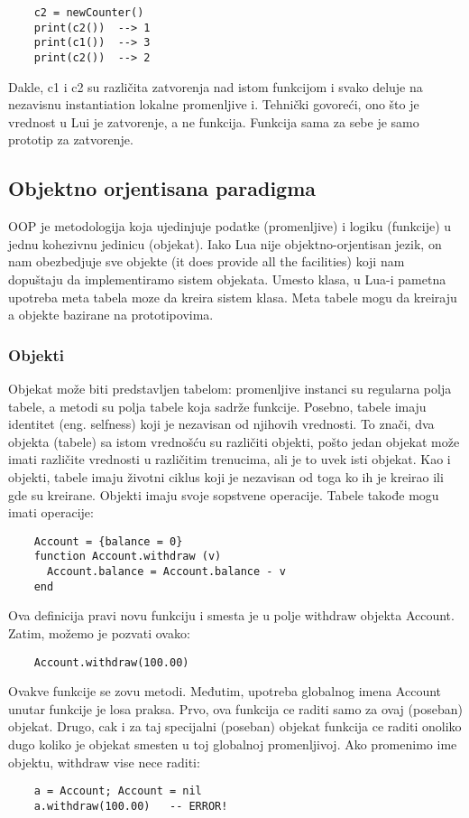 \documentclass[a4paper]{article}
\begin{document}
\begin{verbatim}
    c2 = newCounter()
    print(c2())  --> 1
    print(c1())  --> 3
    print(c2())  --> 2
\end{verbatim}
Dakle, c1 i c2 su različita zatvorenja nad istom funkcijom i svako deluje na nezavisnu instantiation lokalne promenljive i. Tehnički govoreći, ono što je vrednost u Lui je zatvorenje, a ne funkcija. Funkcija sama za sebe je samo prototip za zatvorenje.

\subsection{Objektno orjentisana paradigma}

OOP je metodologija koja ujedinjuje podatke (promenljive) i logiku (funkcije) u jednu kohezivnu jedinicu (objekat). Iako Lua nije objektno-orjentisan jezik, on nam obezbedjuje sve objekte (it does provide all the facilities) koji nam dopuštaju da implementiramo sistem objekata. Umesto klasa, u Lua-i pametna upotreba meta tabela moze da kreira sistem klasa. Meta tabele mogu da kreiraju a objekte bazirane na prototipovima.

\subsubsection{Objekti}
Objekat može biti predstavljen tabelom: promenljive instanci su regularna polja tabele, a metodi su polja tabele koja sadrže funkcije. Posebno, tabele imaju identitet (eng. selfness) koji je nezavisan od njihovih vrednosti. To znači, dva objekta (tabele) sa istom vrednošću su različiti objekti, pošto jedan objekat može imati različite vrednosti u različitim trenucima, ali je to uvek isti objekat. Kao i objekti, tabele imaju životni ciklus koji je nezavisan od toga ko ih je kreirao ili gde su kreirane.
Objekti imaju svoje sopstvene operacije. Tabele takođe mogu imati operacije:
\begin{verbatim}
    Account = {balance = 0}
    function Account.withdraw (v)
      Account.balance = Account.balance - v
    end
\end{verbatim}
Ova definicija pravi novu funkciju i smesta je u polje withdraw objekta Account. Zatim, možemo je pozvati ovako:
\begin{verbatim}
    Account.withdraw(100.00)
\end{verbatim}

Ovakve funkcije se zovu metodi. Međutim, upotreba globalnog imena Account unutar funkcije je losa praksa. Prvo, ova funkcija ce raditi samo za ovaj (poseban) objekat. Drugo, cak i za taj specijalni (poseban) objekat funkcija ce raditi onoliko dugo koliko je objekat smesten u toj globalnoj promenljivoj. Ako promenimo ime objektu, withdraw vise nece raditi:
\begin{verbatim}
    a = Account; Account = nil
    a.withdraw(100.00)   -- ERROR!
\end{verbatim}
\end{document}
